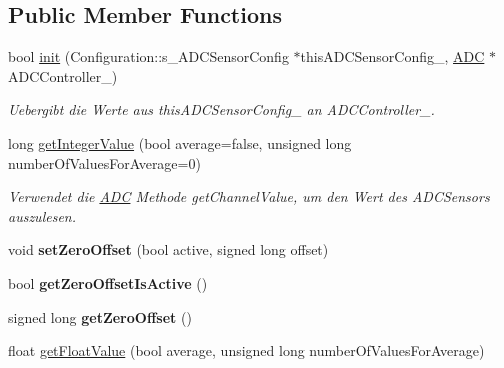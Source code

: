 \subsection*{Public Member Functions}
\begin{DoxyCompactItemize}
\item 
\hypertarget{class_a_d_c_sensor_aed6ea1673ee8566978a6536dcf2da06b}{}bool \hyperlink{class_a_d_c_sensor_aed6ea1673ee8566978a6536dcf2da06b}{init} (Configuration\+::s\+\_\+\+A\+D\+C\+Sensor\+Config $\ast$this\+A\+D\+C\+Sensor\+Config\+\_\+, \hyperlink{class_a_d_c}{A\+D\+C} $\ast$A\+D\+C\+Controller\+\_\+)\label{class_a_d_c_sensor_aed6ea1673ee8566978a6536dcf2da06b}

\begin{DoxyCompactList}\small\item\em Uebergibt die Werte aus this\+A\+D\+C\+Sensor\+Config\+\_\+ an A\+D\+C\+Controller\+\_\+. \end{DoxyCompactList}\item 
\hypertarget{class_a_d_c_sensor_a8c04c1d1598fbbd5d06dca60c5db2567}{}long \hyperlink{class_a_d_c_sensor_a8c04c1d1598fbbd5d06dca60c5db2567}{get\+Integer\+Value} (bool average=false, unsigned long number\+Of\+Values\+For\+Average=0)\label{class_a_d_c_sensor_a8c04c1d1598fbbd5d06dca60c5db2567}

\begin{DoxyCompactList}\small\item\em Verwendet die \hyperlink{class_a_d_c}{A\+D\+C} Methode get\+Channel\+Value, um den Wert des A\+D\+C\+Sensors auszulesen. \end{DoxyCompactList}\item 
\hypertarget{class_a_d_c_sensor_a5ca209e9e3e1d8d28573b830442102bf}{}void {\bfseries set\+Zero\+Offset} (bool active, signed long offset)\label{class_a_d_c_sensor_a5ca209e9e3e1d8d28573b830442102bf}

\item 
\hypertarget{class_a_d_c_sensor_adc99d7daf23fb87e3ada9e1c73dcc58b}{}bool {\bfseries get\+Zero\+Offset\+Is\+Active} ()\label{class_a_d_c_sensor_adc99d7daf23fb87e3ada9e1c73dcc58b}

\item 
\hypertarget{class_a_d_c_sensor_a4bb1cecae2c6aa74892baa01fc454ba0}{}signed long {\bfseries get\+Zero\+Offset} ()\label{class_a_d_c_sensor_a4bb1cecae2c6aa74892baa01fc454ba0}

\item 
\hypertarget{class_a_d_c_sensor_a75e90c10633ae7d55ea01d12e5e71a45}{}float \hyperlink{class_a_d_c_sensor_a75e90c10633ae7d55ea01d12e5e71a45}{get\+Float\+Value} (bool average, unsigned long number\+Of\+Values\+For\+Average)\label{class_a_d_c_sensor_a75e90c10633ae7d55ea01d12e5e71a45}


\end{DoxyCompactItemize}
